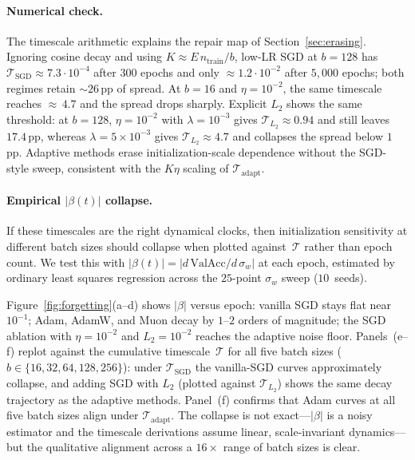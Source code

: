 \documentclass{article}
\begin{document}
\paragraph{Numerical check.}
The timescale arithmetic explains the repair map of
Section~\ref{sec:erasing}.  Ignoring cosine decay and using
$K\!\approx\!E\,n_{\mathrm{train}}/b$, low-LR SGD at $b{=}128$ has
$\mathcal T_{\mathrm{SGD}}\!\approx\!7.3\!\cdot\!10^{-4}$ after $300$
epochs and only $\approx 1.2\!\cdot\!10^{-2}$ after $5{,}000$ epochs;
both regimes retain ${\sim}26$\,pp of spread.  At $b{=}16$ and
$\eta{=}10^{-2}$, the same timescale reaches ${\approx}\,4.7$ and the
spread drops sharply.  Explicit $L_2$ shows the same threshold: at
$b{=}128$, $\eta{=}10^{-2}$ with $\lambda{=}10^{-3}$ gives
$\mathcal T_{L_2}\!\approx\!0.94$ and still leaves $17.4$\,pp, whereas
$\lambda{=}5\!\times\!10^{-3}$ gives $\mathcal T_{L_2}\!\approx\!4.7$
and collapses the spread below $1$\,pp.  Adaptive methods erase
initialization-scale dependence without the SGD-style sweep, consistent
with the $K\eta$ scaling of $\mathcal T_{\mathrm{adapt}}$.
\paragraph{Empirical $|\beta(t)|$ collapse.}
If these timescales are the right dynamical clocks, then initialization sensitivity at different batch sizes should collapse when plotted
against~$\mathcal T$ rather than epoch count.  We test this with
$|\beta(t)|=|d\,\mathrm{ValAcc}/d\,\sigma_w|$ at each epoch, estimated
by ordinary least squares regression across the $25$-point $\sigma_w$ sweep ($10$~seeds).

Figure~\ref{fig:forgetting}(a--d) shows $|\beta|$ versus epoch: vanilla SGD stays flat near $10^{-1}$; Adam, AdamW, and Muon decay by $1$--$2$ orders of magnitude; the SGD ablation with $\eta{=}10^{-2}$ and
$L_2{=}10^{-2}$ reaches the adaptive noise floor.  Panels~(e--f) replot against the cumulative timescale~$\mathcal T$ for all five batch sizes ($b\in\{16,32,64,128,256\}$): under $\mathcal T_{\mathrm{SGD}}$
the vanilla-SGD curves approximately collapse, and adding SGD with $L_2$ (plotted against $\mathcal T_{L_2}$) shows the same decay trajectory as the adaptive methods.  Panel~(f) confirms that Adam curves at all five batch sizes align under
$\mathcal T_{\mathrm{adapt}}$.  The collapse is not exact---$|\beta|$ is a noisy estimator and the timescale derivations assume linear, scale-invariant dynamics---but the qualitative alignment across a $16{\times}$ range of batch sizes is clear.
\end{document}
